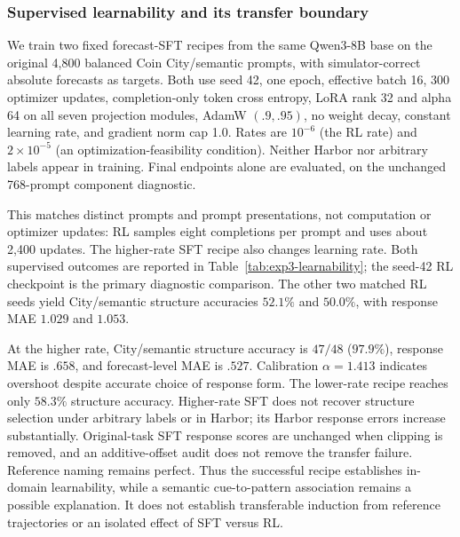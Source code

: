 \subsubsection{Supervised learnability and its transfer boundary}
\label{app:exp3-learnability}

We train two fixed forecast-SFT recipes from the same Qwen3-8B base on the
original 4,800 balanced Coin City/semantic prompts, with simulator-correct
absolute forecasts as targets. Both use seed 42, one epoch, effective batch 16,
300 optimizer updates, completion-only token cross entropy, LoRA rank 32 and
alpha 64 on all seven projection modules, AdamW $(.9,.95)$, no weight decay,
constant learning rate, and gradient norm cap 1.0. Rates are $10^{-6}$ (the RL
rate) and $2\times10^{-5}$ (an optimization-feasibility condition). Neither
Harbor nor arbitrary labels appear in training. Final endpoints alone are
evaluated, on the unchanged 768-prompt component diagnostic.

This matches distinct prompts and prompt presentations, not computation or
optimizer updates: RL samples eight completions per prompt and uses about
2,400 updates. The higher-rate SFT recipe also changes learning rate. Both
supervised outcomes are reported in Table~\ref{tab:exp3-learnability}; the
seed-42 RL checkpoint is the primary diagnostic comparison. The other two
matched RL seeds yield City/semantic structure accuracies $52.1\%$ and
$50.0\%$, with response MAE $1.029$ and $1.053$.

\begin{table}[htbp]
\centering\small
\setlength{\tabcolsep}{4pt}

\caption{\textbf{A supervised recipe learns in-domain structure selection but
fails to transfer.} All trained recipes here use seed 42. Structure accuracy
is derived from forecasts, not reference naming. All outputs parse. Intervals
resample the 24 paired episodes within each cell (2,000 draws); they do not
capture training-seed uncertainty. Both fixed SFT learning rates are retained.}
\label{tab:exp3-learnability}
\end{table}

At the higher rate, City/semantic structure accuracy is $47/48$ ($97.9\%$),
response MAE is $.658$, and forecast-level MAE is $.527$. Calibration
$\alpha=1.413$ indicates overshoot despite accurate choice of response form.
The lower-rate recipe reaches only $58.3\%$ structure accuracy. Higher-rate
SFT does not recover structure selection under arbitrary labels or in Harbor;
its Harbor response errors increase substantially. Original-task SFT response
scores are unchanged when clipping is removed, and an additive-offset audit
does not remove the transfer failure. Reference naming remains perfect.
Thus the successful recipe establishes in-domain learnability, while a
semantic cue-to-pattern association remains a possible explanation. It does
not establish transferable induction from reference trajectories or an isolated
effect of SFT versus RL.

